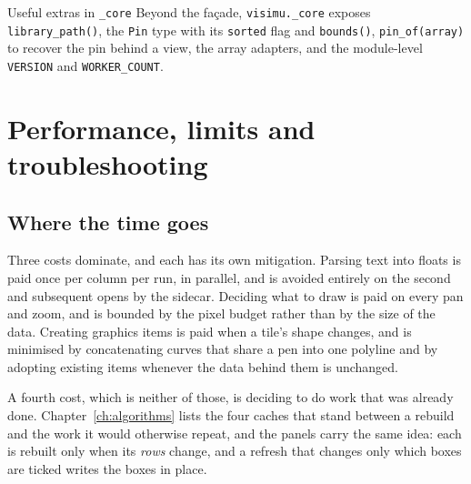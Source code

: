 \documentclass[11pt,a4paper,oneside]{report}
\newcommand{\code}[1]{\texttt{#1}}
\begin{document}
\begin{aoenote}{Useful extras in \code{\_core}}
Beyond the fa\c{c}ade, \code{visimu.\_core} exposes \code{library\_path()},
the \code{Pin} type with its \code{sorted} flag and \code{bounds()},
\code{pin\_of(array)} to recover the pin behind a view, the array adapters, and
the module-level \code{VERSION} and \code{WORKER\_COUNT}.
\end{aoenote}

\chapter{Performance, limits and troubleshooting}
\label{ch:performance}

\section{Where the time goes}

Three costs dominate, and each has its own mitigation. Parsing text into floats
is paid once per column per run, in parallel, and is avoided entirely on the
second and subsequent opens by the sidecar. Deciding what to draw is paid on
every pan and zoom, and is bounded by the pixel budget rather than by the size
of the data. Creating graphics items is paid when a tile's shape changes, and is
minimised by concatenating curves that share a pen into one polyline and by
adopting existing items whenever the data behind them is unchanged.

A fourth cost, which is neither of those, is deciding to do work that was
already done. Chapter~\ref{ch:algorithms} lists the four caches that stand
between a rebuild and the work it would otherwise repeat, and the panels carry
the same idea: each is rebuilt only when its \emph{rows} change, and a
refresh that changes only which boxes are ticked writes the boxes in place.
\end{document}

